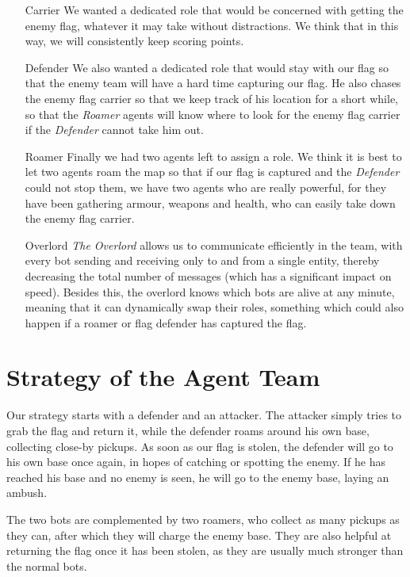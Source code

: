 \begin{enumerate}
\item[Carrier] We wanted a dedicated role that would be concerned with getting the enemy flag, whatever it may take without distractions. We think that in this way, we will consistently keep scoring points.

\item[Defender] We also wanted a dedicated role that would stay with our flag so that the enemy team will have a hard time capturing our flag. He also chases the enemy flag carrier so that we keep track of his location for a short while, so that the \emph{Roamer} agents will know where to look for the enemy flag carrier if the \emph{Defender} cannot take him out.

\item[Roamer] Finally we had two agents left to assign a role. We think it is best to let two agents roam the map so that if our flag is captured and the \emph{Defender} could not stop them, we have two agents who are really powerful, for they have been gathering armour, weapons and health, who can easily take down the enemy flag carrier.

\item[Overlord] \emph{The Overlord} allows us to communicate efficiently in the team, with every bot sending and receiving only to and from a single entity, thereby decreasing the total number of messages (which has a significant impact on speed). Besides this, the overlord knows which bots are alive at any minute, meaning that it can dynamically swap their roles, something which could also happen if a roamer or flag defender has captured the flag.
\end{enumerate} 

\section{Strategy of the Agent Team}
Our strategy starts with a defender and an attacker. The attacker simply tries to grab the flag and return it, while the defender roams around his own base, collecting close-by pickups. As soon as our flag is stolen, the defender will go to his own base once again, in hopes of catching or spotting the enemy. If he has reached his base and no enemy is seen, he will go to the enemy base, laying an ambush.

The two bots are complemented by two roamers, who collect as many pickups as they can, after which they will charge the enemy base. They are also helpful at returning the flag once it has been stolen, as they are usually much stronger than the normal bots.

